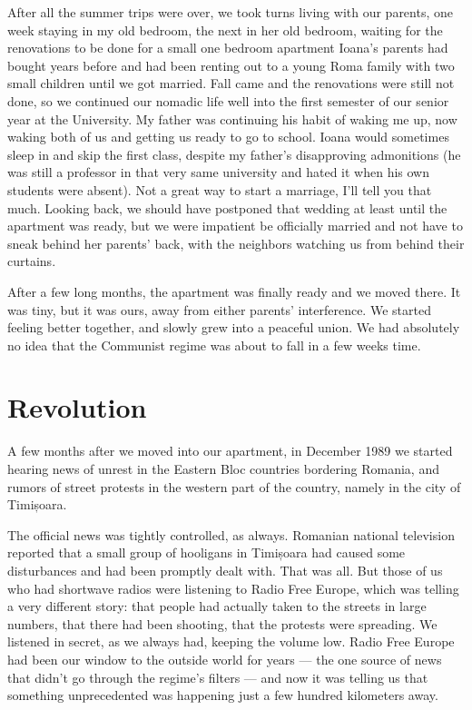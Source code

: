\documentclass[12pt]{book}
\begin{document}
After all the summer trips were over, we took turns living with our
parents, one week staying in my old bedroom, the next in her old
bedroom, waiting for the renovations to be done for a small one bedroom
apartment Ioana's parents had bought years before and had been renting
out to a young Roma family with two small children until we got married.
Fall came and the renovations were still not done, so we continued our
nomadic life well into the first semester of our senior year at the
University. My father was continuing his habit of waking me up, now
waking both of us and getting us ready to go to school. Ioana would
sometimes sleep in and skip the first class, despite my father's
disapproving admonitions (he was still a professor in that very same
university and hated it when his own students were absent). Not a great
way to start a marriage, I'll tell you that much. Looking back, we
should have postponed that wedding at least until the apartment was
ready, but we were impatient be officially married and not have to sneak
behind her parents' back, with the neighbors watching us from behind
their curtains.

After a few long months, the apartment was finally ready and we moved
there. It was tiny, but it was ours, away from either parents'
interference. We started feeling better together, and slowly grew into a
peaceful union. We had absolutely no idea that the Communist regime was
about to fall in a few weeks time.


\section{Revolution}

A few months after we moved into our apartment, in December 1989 we
started hearing news of unrest in the Eastern Bloc countries bordering
Romania, and rumors of street protests in the western part of the
country, namely in the city of Timișoara.

The official news was tightly controlled, as always. Romanian national
television reported that a small group of hooligans in Timișoara had
caused some disturbances and had been promptly dealt with. That was all.
But those of us who had shortwave radios were listening to Radio Free
Europe, which was telling a very different story: that people had
actually taken to the streets in large numbers, that there had been
shooting, that the protests were spreading. We listened in secret, as we
always had, keeping the volume low. Radio Free Europe had been our
window to the outside world for years --- the one source of news that
didn't go through the regime's filters --- and now it was telling us
that something unprecedented was happening just a few hundred kilometers
away.
\end{document}
